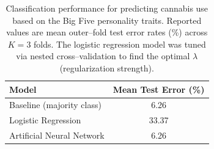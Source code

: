 
\begin{table}[H]
    \centering
    \caption{Classification performance for predicting cannabis use based on the Big Five personality traits.
    Reported values are mean outer–fold test error rates (\%) across $K = 3$ folds.
    The logistic regression model was tuned via nested cross–validation to find the optimal $\lambda$ (regularization strength).}
    \label{tab:classification:cannabis}
    \begin{tabular}{l c}
        \toprule
        \textbf{Model} & \textbf{Mean Test Error (\%)} \\
        \midrule
        Baseline (majority class) & 6.26 \\
        Logistic Regression & 33.37 \\
        Artificial Neural Network & 6.26 \\
        \bottomrule
    \end{tabular}
\end{table}
